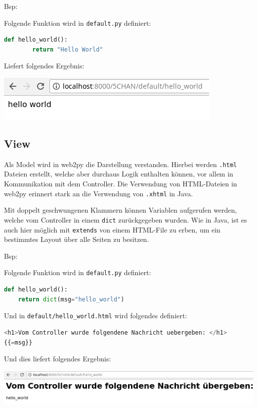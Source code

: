 Bsp:

Folgende Funktion wird in \verb|default.py| definiert:

\begin{lstlisting}[language=python]
	def hello_world():
		return "Hello World"
\end{lstlisting}

Liefert folgendes Ergebnis:

\begin{minipage}{\linewidth}
	\centering
	\includegraphics[width=0.45\linewidth]{images/hello_world}
\end{minipage}

\subsection{View}
Als Model wird in web2py die Darstellung verstanden. Hierbei werden \verb|.html| Dateien erstellt, welche aber durchaus Logik enthalten können, vor allem in Kommunikation mit dem Controller. Die Verwendung von HTML-Dateien in web2py erinnert stark an die Verwendung von \verb|.xhtml| in Java. 

Mit doppelt geschwungenen Klammern können Variablen aufgerufen werden, welche vom Controller in einem \verb|dict| zurückgegeben wurden. Wie in Java, ist es auch hier möglich mit \verb|extends| von einem HTML-File zu erben, um ein bestimmtes Layout über alle Seiten zu besitzen.

Bsp:

Folgende Funktion wird in \verb|default.py| definiert:

\begin{lstlisting}[language=python]
def hello_world():
	return dict(msg="hello_world")	
\end{lstlisting}

Und in \verb|default/hello_world.html| wird folgendes definiert:

\begin{lstlisting}[language=python]
<h1>Vom Controller wurde folgendene Nachricht uebergeben: </h1>
{{=msg}}
\end{lstlisting}

Und dies liefert folgendes Ergebnis:

\begin{minipage}{\linewidth}
	\centering
	\includegraphics[width=1\linewidth]{images/hello_world2}
\end{minipage}

